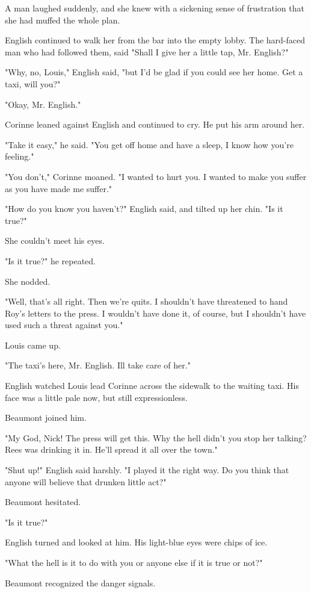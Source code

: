 \documentclass{novel}
\begin{document}
A man laughed suddenly, and she knew with a sickening sense of frustration that she had muffed the whole plan.

English continued to walk her from the bar into the empty lobby. The hard-faced man who had followed them, said "Shall I give her a little tap, Mr. English?"

"Why, no, Louis," English said, "but I'd be glad if you could see her home. Get a taxi, will you?"

"Okay, Mr. English."

Corinne leaned against English and continued to cry. He put his arm around her.

"Take it easy," he said. "You get off home and have a sleep, I know how you're feeling."

"You don't," Corinne moaned. "I wanted to hurt you. I wanted to make you suffer as you have made me suffer."

"How do you know you haven't?" English said, and tilted up her chin. "Is it true?"

She couldn't meet his eyes.

"Is it true?" he repeated.

She nodded.

"Well, that's all right. Then we're quits. I shouldn't have threatened to hand Roy's letters to the press. I wouldn't have done it, of course, but I shouldn't have used such a threat against you."

Louis came up.

"The taxi's here, Mr. English. Ill take care of her."

English watched Louis lead Corinne across the sidewalk to the waiting taxi. His face was a little pale now, but still expressionless.

Beaumont joined him.

"My God, Nick! The press will get this. Why the hell didn't you stop her talking? Rees was drinking it in. He'll spread it all over the town."

"Shut up!" English said harshly. "I played it the right way. Do you think that anyone will believe that drunken little act?"

Beaumont hesitated.

"Is it true?"

English turned and looked at him. His light-blue eyes were chips of ice.

"What the hell is it to do with you or anyone else if it is true or not?"

Beaumont recognized the danger signals.
\end{document}
